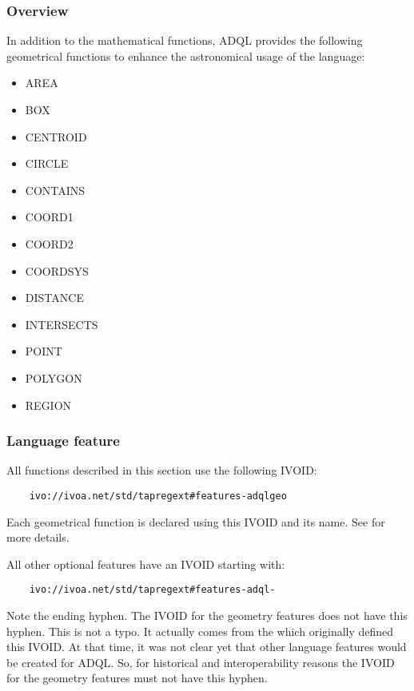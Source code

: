 \documentclass[11pt,a4paper]{ivoa}
\begin{document}
\subsubsection{Overview}
\label{sec:functions.geom.overview}

In addition to the mathematical functions, ADQL provides the following geometrical
functions to enhance the astronomical usage of the language:

\begin{itemize}
    \item AREA
    \item BOX
    \item CENTROID
    \item CIRCLE
    \item CONTAINS
    \item COORD1
    \item COORD2
    \item COORDSYS
    \item DISTANCE
    \item INTERSECTS
    \item POINT
    \item POLYGON
    \item REGION
\end{itemize}

\subsubsection{Language feature}
\label{sec:functions.geom.feature}

All functions described in this section use the following IVOID:

\begin{verbatim}
    ivo://ivoa.net/std/tapregext#features-adqlgeo
\end{verbatim}

Each geometrical function is declared using this IVOID and its name.
See  for more details.

All other optional features have an IVOID starting with:

\begin{verbatim}
    ivo://ivoa.net/std/tapregext#features-adql-
\end{verbatim}

Note the ending hyphen. The IVOID for the geometry features does not have this
hyphen. This is not a typo. It actually comes from the \TAPRegSpec{} which
originally defined this IVOID. At that time, it was not clear yet that other
language features would be created for ADQL. So, for historical and
interoperability reasons the IVOID for the geometry features must not have this
hyphen.
\end{document}
